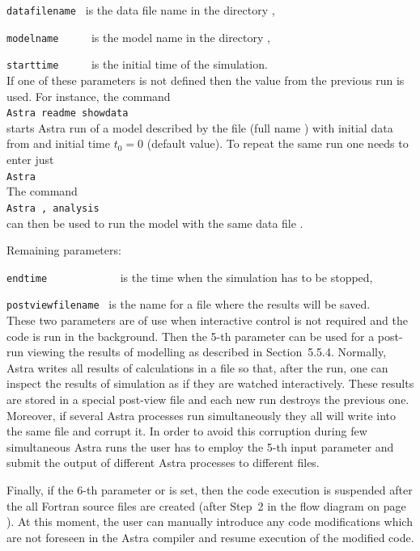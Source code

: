 {\tt data\us file\us name~} is the data file name in the directory
, 

{\tt model\us name~~~~~} is the model name in the directory
, 

{\tt start\us time~~~~~} is the initial time of the simulation.\\
If one of these parameters is not defined then the value from the
previous run is used.
For instance, the command
\\{\indent
\tt Astra readme showdata
}\\
starts Astra run of a model described by the file
 (full name ) with initial data
from  and initial time $t_0=0$ (default value).
To repeat the same run one needs to enter just
\\{\indent
\tt Astra
}\\
The command
\\{\indent
\tt Astra , analysis
}\\
can then be used to run the model  with the same
data file .

Remaining parameters:
 
{\tt end\us time~~~~~~~~~~~~} is the time when the simulation has
to be stopped, 

{\tt post\us view\us file\us name~} is the name for a file where the
results will be saved.\\
These two parameters are of use when interactive control is not required
and the code is run in the background. 
Then the 5-th parameter can be used for a post-run viewing the
results of modelling as described in Section~5.5.4. 
Normally, Astra writes all results of calculations in a file so that,
after the run, one can inspect the results of simulation as if they are
watched interactively.
These results are stored in a special post-view file and each new run
destroys the previous one.
Moreover, if several Astra processes run simultaneously they all will
write into the same file and corrupt it. 
In order to avoid this corruption during few simultaneous Astra runs 
the user has to employ the 5-th input parameter and submit the output of
different Astra processes to different files.

Finally, if the 6-th parameter  or  is set,
then the code execution is suspended after the all Fortran source files
are created (after Step~2 in the flow diagram on page \pageref{flow}). 
At this moment, the user can manually introduce any code modifications
which are not foreseen in the Astra compiler and resume execution of the
modified code. 

